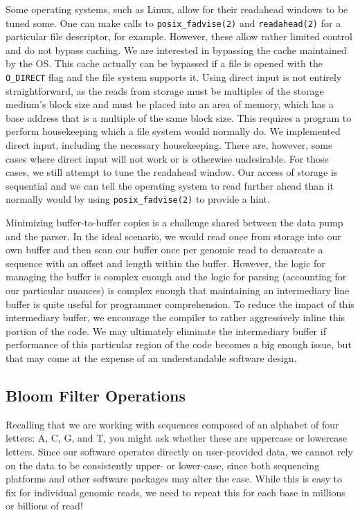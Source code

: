 \documentclass{article}
\begin{document}
Some operating systems, such as Linux, allow for their readahead windows to be
tuned some. One can make calls to \texttt{posix\_fadvise(2)} and
\texttt{readahead(2)} for a particular file descriptor, for example. However,
these allow rather limited control and do not bypass caching. We are interested
in bypassing the cache maintained by the OS. This cache actually can be
bypassed if a file is opened with the \texttt{O\_DIRECT} flag and the file
system supports it. Using direct input is not entirely straightforward, as the
reads from storage must be multiples of the storage medium's block size and
must be placed into an area of memory, which has a base address that is a
multiple of the same block size. This requires a program to perform
housekeeping which a file system would normally do. We implemented direct
input, including the necessary housekeeping. There are, however, some cases
where direct input will not work or is otherwise undesirable. For those cases,
we still attempt to tune the readahead window.  Our access of storage is
sequential and we can tell the operating system to read further ahead than it
normally would by using \texttt{posix\_fadvise(2)} to provide a hint.

Minimizing buffer-to-buffer copies is a challenge shared between the data pump
and the parser. In the ideal scenario, we would read once from storage into our
own buffer and then scan our buffer once per genomic read to demarcate a
sequence with an offset and length within the buffer. However, the logic for
managing the buffer is complex enough and the logic for parsing (accounting for
our particular nuances) is complex enough that maintaining an intermediary line
buffer is quite useful for programmer comprehension. To reduce the impact of
this intermediary buffer, we encourage the compiler to rather aggressively
inline this portion of the code. We may ultimately eliminate the intermediary
buffer if performance of this particular region of the code becomes a big
enough issue, but that may come at the expense of an understandable software
design.

\subsection{Bloom Filter Operations}

Recalling that we are working with sequences composed of an alphabet of four
letters: A, C, G, and T, you might ask whether these are uppercase or lowercase
letters. Since our software operates directly on user-provided data, we cannot
rely on the data to be consistently upper- or lower-case, since
both sequencing platforms and other software packages may alter the case.
While this is easy to fix for individual genomic reads, we need to repeat
this for each base in millions or billions of read!
\end{document}
